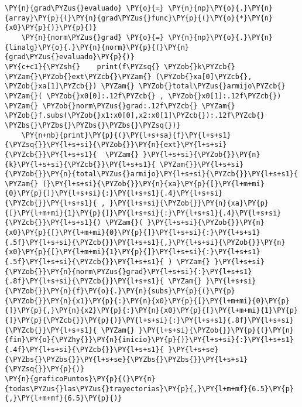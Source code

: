 \begin{itemize}
\begin{tcolorbox}[breakable, size=fbox, boxrule=1pt, pad at break*=1mm,colback=cellbackground, colframe=cellborder]
\begin{Verbatim}[commandchars=\\\{\}]
    \PY{n}{grad\PYZus{}evaluado} \PY{o}{=} \PY{n}{np}\PY{o}{.}\PY{n}{array}\PY{p}{(}\PY{n}{grad\PYZus{}func}\PY{p}{(}\PY{o}{*}\PY{n}{x0}\PY{p}{)}\PY{p}{)}
    \PY{n}{norm\PYZus{}grad} \PY{o}{=} \PY{n}{np}\PY{o}{.}\PY{n}{linalg}\PY{o}{.}\PY{n}{norm}\PY{p}{(}\PY{n}{grad\PYZus{}evaluado}\PY{p}{)}
\PY{c+c1}{\PYZsh{}    print(f\PYZsq{} \PYZob{}k\PYZcb{} \PYZam{}\PYZob{}ext\PYZcb{}\PYZam{} (\PYZob{}xa[0]\PYZcb{}, \PYZob{}xa[1]\PYZcb{}) \PYZam{} \PYZob{}total\PYZus{}armijo\PYZcb{} \PYZam{}( \PYZob{}x0[0]:.12f\PYZcb{} , \PYZob{}x0[1]:.12f\PYZcb{}) \PYZam{} \PYZob{}norm\PYZus{}grad:.12f\PYZcb{} \PYZam{} \PYZob{}f.subs(\PYZob{}x1:x0[0],x2:x0[1]\PYZcb{}):.12f\PYZcb{}  \PYZbs{}\PYZbs{}\PYZbs{}\PYZbs{}\PYZsq{})}
    \PY{n+nb}{print}\PY{p}{(}\PY{l+s+sa}{f}\PY{l+s+s1}{\PYZsq{}}\PY{l+s+si}{\PYZob{}}\PY{n}{ext}\PY{l+s+si}{\PYZcb{}}\PY{l+s+s1}{  \PYZam{} }\PY{l+s+si}{\PYZob{}}\PY{n}{k}\PY{l+s+si}{\PYZcb{}}\PY{l+s+s1}{ \PYZam{}}\PY{l+s+si}{\PYZob{}}\PY{n}{total\PYZus{}armijo}\PY{l+s+si}{\PYZcb{}}\PY{l+s+s1}{ \PYZam{} (}\PY{l+s+si}{\PYZob{}}\PY{n}{xa}\PY{p}{[}\PY{l+m+mi}{0}\PY{p}{]}\PY{l+s+si}{:}\PY{l+s+s1}{.4}\PY{l+s+si}{\PYZcb{}}\PY{l+s+s1}{ , }\PY{l+s+si}{\PYZob{}}\PY{n}{xa}\PY{p}{[}\PY{l+m+mi}{1}\PY{p}{]}\PY{l+s+si}{:}\PY{l+s+s1}{.4}\PY{l+s+si}{\PYZcb{}}\PY{l+s+s1}{) \PYZam{}( }\PY{l+s+si}{\PYZob{}}\PY{n}{x0}\PY{p}{[}\PY{l+m+mi}{0}\PY{p}{]}\PY{l+s+si}{:}\PY{l+s+s1}{.5f}\PY{l+s+si}{\PYZcb{}}\PY{l+s+s1}{,}\PY{l+s+si}{\PYZob{}}\PY{n}{x0}\PY{p}{[}\PY{l+m+mi}{1}\PY{p}{]}\PY{l+s+si}{:}\PY{l+s+s1}{.5f}\PY{l+s+si}{\PYZcb{}}\PY{l+s+s1}{ ) \PYZam{} }\PY{l+s+si}{\PYZob{}}\PY{n}{norm\PYZus{}grad}\PY{l+s+si}{:}\PY{l+s+s1}{.8f}\PY{l+s+si}{\PYZcb{}}\PY{l+s+s1}{ \PYZam{} }\PY{l+s+si}{\PYZob{}}\PY{n}{f}\PY{o}{.}\PY{n}{subs}\PY{p}{(}\PY{p}{\PYZob{}}\PY{n}{x1}\PY{p}{:}\PY{n}{x0}\PY{p}{[}\PY{l+m+mi}{0}\PY{p}{]}\PY{p}{,}\PY{n}{x2}\PY{p}{:}\PY{n}{x0}\PY{p}{[}\PY{l+m+mi}{1}\PY{p}{]}\PY{p}{\PYZcb{}}\PY{p}{)}\PY{l+s+si}{:}\PY{l+s+s1}{.8f}\PY{l+s+si}{\PYZcb{}}\PY{l+s+s1}{ \PYZam{} }\PY{l+s+si}{\PYZob{}}\PY{p}{(}\PY{n}{fin}\PY{o}{\PYZhy{}}\PY{n}{inicio}\PY{p}{)}\PY{l+s+si}{:}\PY{l+s+s1}{.4f}\PY{l+s+si}{\PYZcb{}}\PY{l+s+s1}{ }\PY{l+s+se}{\PYZbs{}\PYZbs{}}\PY{l+s+se}{\PYZbs{}\PYZbs{}}\PY{l+s+s1}{\PYZsq{}}\PY{p}{)}
\PY{n}{graficoPuntos}\PY{p}{(}\PY{n}{todas\PYZus{}las\PYZus{}trayectorias}\PY{p}{,}\PY{l+m+mf}{6.5}\PY{p}{,}\PY{l+m+mf}{6.5}\PY{p}{)}
\end{Verbatim}
\end{tcolorbox}


\end{itemize}
